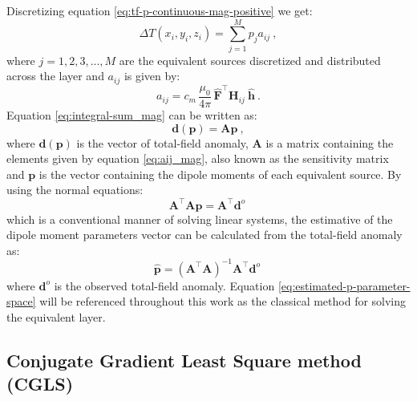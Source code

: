Discretizing equation \ref{eq:tf-p-continuous-mag-positive} we get:
\begin{equation}
\Delta T(x_{i}, y_{i}, z_{i}) = \sum_{j=1}^{M} p_j a_{ij}\: ,
\label{eq:integral-sum_mag}
\end{equation}
where $j = 1,2,3,...,M$ are the equivalent sources discretized and distributed across the layer and $a_{ij}$ is given by:
\begin{equation}
a_{ij}
= c_{m} \, \frac{\mu_{0}}{4\pi} \, \hat{\mathbf{F}}^{\top} \mathbf{H}_{ij} \: \hat{\mathbf{h}} \: .
\label{eq:aij_mag}
\end{equation}
Equation \ref{eq:integral-sum_mag} can be written as:
\begin{equation}
\mathbf{d}(\mathbf{p}) = \mathbf{A} \mathbf{p} \: ,
\label{eq:predicted-data-vector_mag}
\end{equation}
where $\mathbf{d}(\mathbf{p})$ is the vector of total-field anomaly, $\mathbf{A}$ is a matrix containing the elements given by equation \ref{eq:aij_mag}, also known as the sensitivity matrix and $\mathbf{p}$ is the vector containing the dipole moments of each equivalent source. By using the normal equations:
\begin{equation}
	\mathbf{A}^{\top}\mathbf{A}{\mathbf{p}} = 
	\mathbf{A}^{\top} \mathbf{d}^{o} \:
	\label{eq:normal-equations}
\end{equation} 
which is a conventional manner of solving linear systems, the estimative of the dipole moment parameters vector can be calculated from the total-field anomaly as:
\begin{equation}
\hat{\mathbf{p}} = \left( \mathbf{A}^{\top}\mathbf{A} %
\right)^{-1}
\mathbf{A}^{\top} \mathbf{d}^{o} \:
\label{eq:estimated-p-parameter-space}
\end{equation}
where $\mathbf{d}^{o}$ is the observed total-field anomaly. Equation \ref{eq:estimated-p-parameter-space} will be referenced throughout this work as the classical method for solving the equivalent layer.

\subsection{Conjugate Gradient Least Square method (CGLS)}

